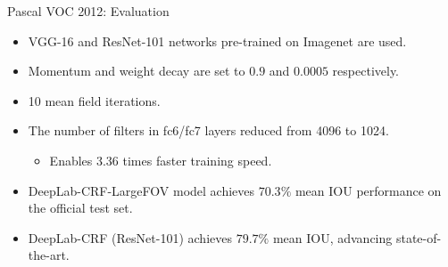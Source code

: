 \documentclass{beamer}
\newcommand\pro{\item[$+$]}
\begin{document}
\begin{frame}{Pascal VOC 2012: Evaluation}
\begin{itemize}
	\item<1-> VGG-16 and ResNet-101 networks pre-trained on Imagenet are used.
	\item<2-> {\color{blue}Momentum} and {\color{blue}weight decay} are set to $0.9$ and $0.0005$ respectively.
	\item<3-> 10 mean field iterations.
	\item<4-> The number of filters in fc6/fc7 layers reduced from 4096 to 1024.

\begin{itemize}
	\pro Enables 3.36 times faster training speed.
\end{itemize}
	\item<5-> DeepLab-CRF-LargeFOV model achieves $70.3\%$ mean IOU performance	on the official {\color{blue}test set}.
	\item<6-> DeepLab-CRF (ResNet-101) achieves $79.7\%$ mean IOU, advancing state-of-the-art.
\end{itemize}
\end{frame}
\end{document}

